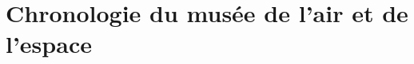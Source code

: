 \documentclass[12pt,twoside]{book}
\begin{document}
\chapter[Chronologie du MAE]{Chronologie du musée de l'air et de l'espace}



\newpage{\pagestyle{empty}\cleardoublepage}



\backmatter %




\printglossaries
{}




\tableofcontents


\end{document}
